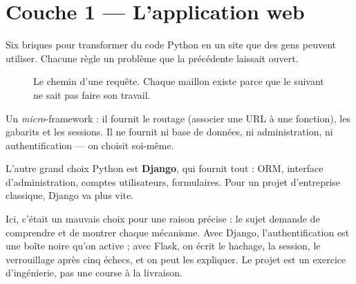 \chapter{Couche 1 — L'application web}

Six briques pour transformer du code Python en un site que des gens peuvent
utiliser. Chacune règle un problème que la précédente laissait ouvert.

\begin{figure}[htbp]
\centering
{}
\caption{Le chemin d'une requête. Chaque maillon existe parce que le suivant ne
sait pas faire son travail.}
\end{figure}


\quoi
Un \emph{micro}-framework : il fournit le routage (associer une URL à une
fonction), les gabarits et les sessions. Il ne fournit ni base de données, ni
administration, ni authentification --- on choisit soi-même.

\pourquoi
L'autre grand choix Python est \textbf{Django}, qui fournit tout : ORM,
interface d'administration, comptes utilisateurs, formulaires. Pour un projet
d'entreprise classique, Django va plus vite.

Ici, c'était un mauvais choix pour une raison précise : le sujet demande de
comprendre et de montrer chaque mécanisme. Avec Django, l'authentification est
une boîte noire qu'on active ; avec Flask, on écrit le hachage, la session, le
verrouillage après cinq échecs, et on peut les expliquer. Le projet est un
exercice d'ingénierie, pas une course à la livraison.

